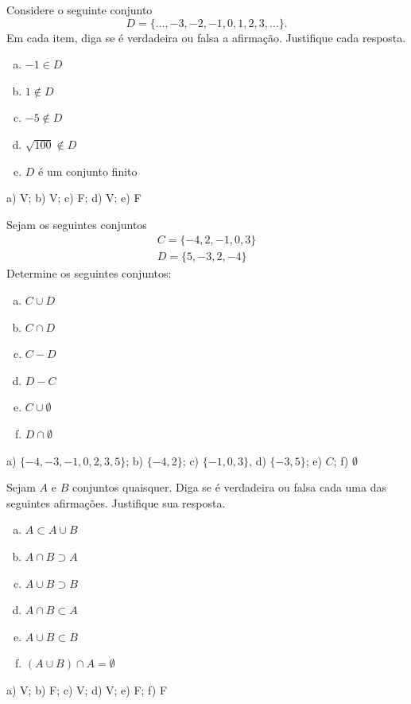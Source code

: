 \begin{exer}
  Considere o seguinte conjunto
  \begin{equation}
    D = \{...,-3,-2,-1,0,1,2,3,...\}.
  \end{equation}
  Em cada item, diga se é verdadeira ou falsa a afirmação. Justifique cada resposta.
  \begin{enumerate}[a)]
  \item $-1\in D$
  \item $1\not\in D$
  \item $-5\not\in D$
  \item $\sqrt{100}\not\in D$
  \item $D$ é um conjunto finito
  \end{enumerate}
\end{exer}
\begin{resp}
  a) V; b) V; c) F; d) V; e) F
\end{resp}

\begin{exer}
  Sejam os seguintes conjuntos
  \begin{gather}
    C = \{-4,2,-1,0,3\}\\
    D = \{5,-3,2,-4\}
  \end{gather}
  Determine os seguintes conjuntos:
  \begin{enumerate}[a)]
  \item $C\cup D$
  \item $C\cap D$
  \item $C - D$
  \item $D - C$
  \item $C\cup \emptyset$
  \item $D\cap \emptyset$
  \end{enumerate}
\end{exer}
\begin{resp}
  a) $\{-4,-3,-1,0,2,3,5\}$; b) $\{-4,2\}$; c) $\{-1,0,3\}$, d) $\{-3,5\}$; e) $C$; f) $\emptyset$
\end{resp}

\begin{exer}
  Sejam $A$ e $B$ conjuntos quaisquer. Diga se é verdadeira ou falsa cada uma das seguintes afirmações. Justifique sua resposta.
  \begin{enumerate}[a)]
  \item $A \subset A\cup B$
  \item $A\cap B \supset A$
  \item $A\cup B \supset B$
  \item $A\cap B \subset A$
  \item $A\cup B \subset B$
  \item $(A\cup B)\cap A = \emptyset$
  \end{enumerate}
\end{exer}
\begin{resp}
  a) V; b) F; c) V; d) V; e) F; f) F
\end{resp}

